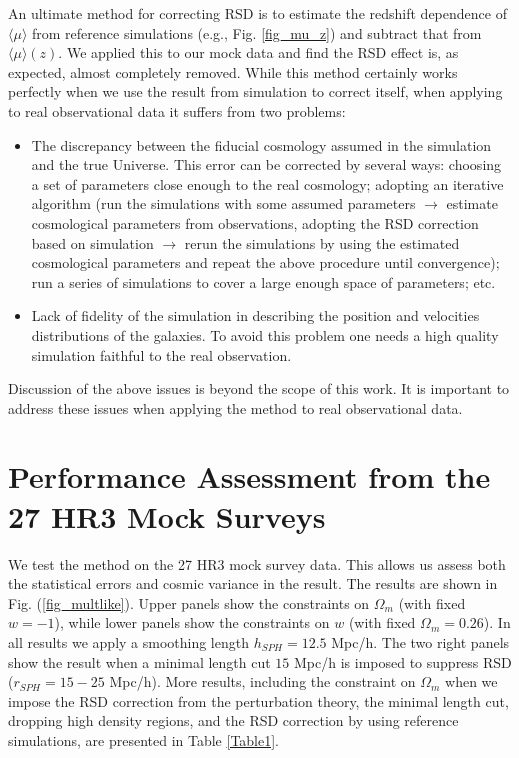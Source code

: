 \documentclass{emulateapj}
\begin{document}
An ultimate method for correcting RSD is to estimate the redshift dependence of $\langle\mu\rangle$ from reference simulations 
(e.g., Fig. \ref{fig_mu_z}) and subtract that from $\langle\mu\rangle(z)$.
We applied this to our mock data and find the RSD effect is, as expected, almost completely removed.
While this method certainly works perfectly when we use the result from simulation to correct itself, 
when applying to real observational data it suffers from two problems:
\begin{itemize}
 \item The discrepancy between the fiducial cosmology assumed in the simulation and the true Universe.
 This error can be corrected by several ways:
 choosing a set of parameters close enough to the real cosmology;
 adopting an iterative algorithm (run the simulations with some assumed parameters 
 $\rightarrow$ estimate cosmological parameters from observations, adopting the RSD correction based on simulation
 $\rightarrow$ rerun the simulations by using the estimated cosmological parameters and repeat the above procedure until convergence);
 run a series of simulations to cover a large enough space of parameters; etc.
 \item Lack of fidelity of the simulation in describing the position and velocities distributions of the galaxies.
 To avoid this problem one needs a high quality simulation faithful to the real observation. 
\end{itemize}
Discussion of the above issues is beyond the scope of this work.
It is important to address these issues when applying the method to real observational data.

\section{Performance Assessment from the 27 HR3 Mock Surveys}

We test the method on the 27 HR3 mock survey data.
This allows us assess both the statistical errors and cosmic variance in the result.
The results are shown in Fig. (\ref{fig_multlike}).
Upper panels show the constraints on $\Omega_m$ (with fixed $w=-1$),
while lower panels show the constraints on $w$ (with fixed $\Omega_m = 0.26$).
In all results we apply a smoothing length $h_{SPH}=12.5$ Mpc/h.
The two right panels show the result when a minimal length cut $15$ Mpc/h is imposed to suppress RSD ($r_{SPH}=15-25$ Mpc/h).
More results, including the constraint on $\Omega_m$ when we impose the RSD correction from the perturbation theory, 
the minimal length cut, dropping high density regions, and the RSD correction by using reference simulations, 
are presented in Table \ref{Table1}.
\end{document}

